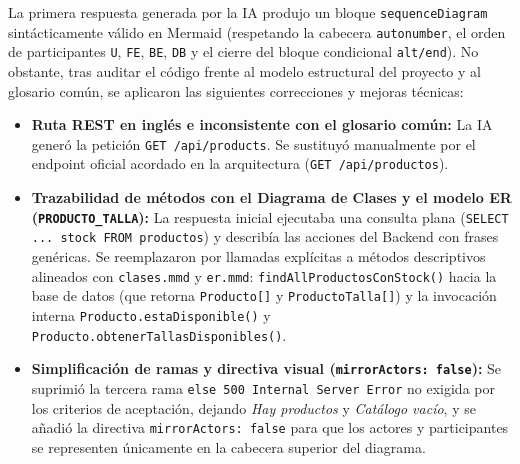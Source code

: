 La primera respuesta generada por la IA produjo un bloque \texttt{sequenceDiagram} sintácticamente válido en Mermaid (respetando la cabecera \texttt{autonumber}, el orden de participantes \texttt{U}, \texttt{FE}, \texttt{BE}, \texttt{DB} y el cierre del bloque condicional \texttt{alt/end}). No obstante, tras auditar el código frente al modelo estructural del proyecto y al glosario común, se aplicaron las siguientes correcciones y mejoras técnicas:
\begin{itemize}[leftmargin=*,nosep]
\item \textbf{Ruta REST en inglés e inconsistente con el glosario común:} La IA generó la petición \texttt{GET /api/products}. Se sustituyó manualmente por el endpoint oficial acordado en la arquitectura (\texttt{GET /api/productos}).
\item \textbf{Trazabilidad de métodos con el Diagrama de Clases y el modelo ER (\texttt{PRODUCTO\_TALLA}):} La respuesta inicial ejecutaba una consulta plana (\texttt{SELECT ... stock FROM productos}) y describía las acciones del Backend con frases genéricas. Se reemplazaron por llamadas explícitas a métodos descriptivos alineados con \texttt{clases.mmd} y \texttt{er.mmd}: \texttt{findAllProductosConStock()} hacia la base de datos (que retorna \texttt{Producto[]} y \texttt{ProductoTalla[]}) y la invocación interna \texttt{Producto.estaDisponible()} y \texttt{Producto.obtenerTallasDisponibles()}.
\item \textbf{Simplificación de ramas y directiva visual (\texttt{mirrorActors: false}):} Se suprimió la tercera rama \texttt{else 500 Internal Server Error} no exigida por los criterios de aceptación, dejando \emph{Hay productos} y \emph{Catálogo vacío}, y se añadió la directiva \texttt{mirrorActors: false} para que los actores y participantes se representen únicamente en la cabecera superior del diagrama.
\end{itemize}
